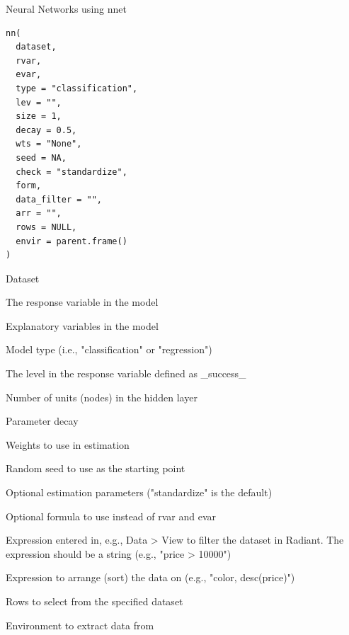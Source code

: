 \documentclass[a4paper]{book}
\begin{document}
%
\begin{Description}
Neural Networks using nnet
\end{Description}
%
\begin{Usage}
\begin{verbatim}
nn(
  dataset,
  rvar,
  evar,
  type = "classification",
  lev = "",
  size = 1,
  decay = 0.5,
  wts = "None",
  seed = NA,
  check = "standardize",
  form,
  data_filter = "",
  arr = "",
  rows = NULL,
  envir = parent.frame()
)
\end{verbatim}
\end{Usage}
%
\begin{Arguments}
\begin{ldescription}
\item[\code{dataset}] Dataset

\item[\code{rvar}] The response variable in the model

\item[\code{evar}] Explanatory variables in the model

\item[\code{type}] Model type (i.e., "classification" or "regression")

\item[\code{lev}] The level in the response variable defined as \_success\_

\item[\code{size}] Number of units (nodes) in the hidden layer

\item[\code{decay}] Parameter decay

\item[\code{wts}] Weights to use in estimation

\item[\code{seed}] Random seed to use as the starting point

\item[\code{check}] Optional estimation parameters ("standardize" is the default)

\item[\code{form}] Optional formula to use instead of rvar and evar

\item[\code{data\_filter}] Expression entered in, e.g., Data > View to filter the dataset in Radiant. The expression should be a string (e.g., "price > 10000")

\item[\code{arr}] Expression to arrange (sort) the data on (e.g., "color, desc(price)")

\item[\code{rows}] Rows to select from the specified dataset

\item[\code{envir}] Environment to extract data from
\end{ldescription}
\end{Arguments}
\end{document}

